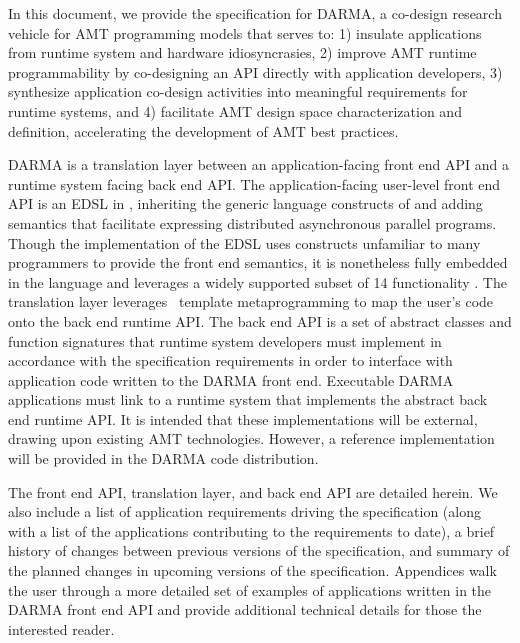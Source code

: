 
In this document, we provide the specification for \gls{DARMA}, 
a co-design research vehicle for \gls{AMT} \glspl{programming model} that 
serves to:
1) insulate applications from \gls{runtime system} and hardware idiosyncrasies,
2) improve \gls{AMT} runtime programmability by co-designing an \gls{API} directly with
  application developers, 3) synthesize application \gls{co-design} activities into
  meaningful requirements for \glspl{runtime system}, and 4) 
facilitate \gls{AMT} design space characterization and definition, accelerating the
development of \gls{AMT} best practices.

\gls{DARMA} is a \gls{translation layer} between an 
application-facing \gls{front end} \gls{API} and a \gls{runtime system} facing \gls{back end} 
\gls{API}.    The application-facing user-level \gls{front end} \gls{API} 
is an \gls{EDSL} in \CC,  inheriting the generic
language constructs of \CC and adding \gls{semantics} that facilitate expressing
distributed asynchronous parallel programs. Though the implementation of the \gls{EDSL} uses
\CC constructs unfamiliar to many programmers to provide the front end semantics, 
it is nonetheless fully embedded in the \CC language and
leverages a widely supported subset of \CC{}14 functionality \compilerReqs.
The \gls{translation layer} leverages \CC\ \gls{template
metaprogramming} to map the user's code onto the \gls{back end} runtime \gls{API}.
The \gls{back end} \gls{API} is a set of abstract classes and function
signatures that \gls{runtime system} developers must implement in accordance with the
specification requirements in order to interface with application code written
to the \gls{DARMA} front end. Executable \gls{DARMA} applications must link to a \gls{runtime
  system} that implements the abstract \gls{back end} runtime \gls{API}.
It is intended that these implementations will be external, drawing upon
existing \gls{AMT} technologies.  However,  a reference implementation will be provided
in the \gls{DARMA} code distribution.

The \gls{front end} \gls{API}, \gls{translation layer}, and \gls{back end}
\gls{API} are detailed herein. We also
include a list of application requirements driving the specification (along
with a list of the applications contributing to the requirements to date), 
a brief history of changes between previous
versions of the specification, and summary of the planned changes in upcoming
versions of the specification.  Appendices walk the user through a more detailed set
of examples of applications written in the \gls{DARMA} \gls{front end} \gls{API} and provide
additional technical details for those the interested reader.

